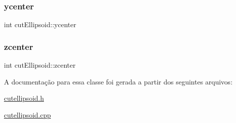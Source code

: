 \subsubsection{\texorpdfstring{ycenter}{ycenter}}
{\footnotesize\ttfamily int cut\+Ellipsoid\+::ycenter\hspace{0.3cm}{\ttfamily [protected]}}

\mbox{\label{classcut_ellipsoid_abd11fe46fed39a748129765595798dc5}} 
\subsubsection{\texorpdfstring{zcenter}{zcenter}}
{\footnotesize\ttfamily int cut\+Ellipsoid\+::zcenter\hspace{0.3cm}{\ttfamily [protected]}}



A documentação para essa classe foi gerada a partir dos seguintes arquivos\+:\begin{DoxyCompactItemize}
\item 
\mbox{\hyperlink{cutellipsoid_8h}{cutellipsoid.\+h}}\item 
\mbox{\hyperlink{cutellipsoid_8cpp}{cutellipsoid.\+cpp}}\end{DoxyCompactItemize}
